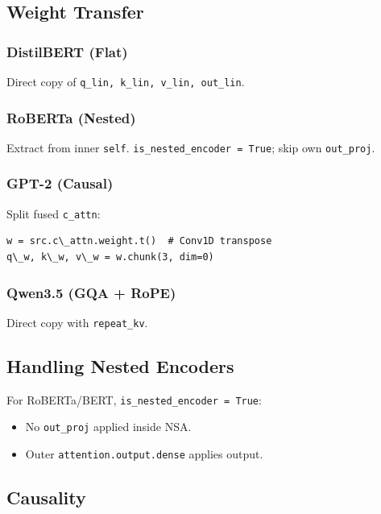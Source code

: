 \subsection{Weight Transfer}

\subsubsection{DistilBERT (Flat)}

Direct copy of \texttt{q\_lin, k\_lin, v\_lin, out\_lin}.

\subsubsection{RoBERTa (Nested)}

Extract from inner \texttt{self}. \texttt{is\_nested\_encoder = True}; skip own \texttt{out\_proj}.

\subsubsection{GPT-2 (Causal)}

Split fused \texttt{c\_attn}:

\begin{lstlisting}
w = src.c\_attn.weight.t()  # Conv1D transpose
q\_w, k\_w, v\_w = w.chunk(3, dim=0)
\end{lstlisting}

\subsubsection{Qwen3.5 (GQA + RoPE)}

Direct copy with \texttt{repeat\_kv}.

\subsection{Handling Nested Encoders}

For RoBERTa/BERT, \texttt{is\_nested\_encoder = True}:
\begin{itemize}
\item No \texttt{out\_proj} applied inside NSA.
\item Outer \texttt{attention.output.dense} applies output.

\end{itemize}
\subsection{Causality}

